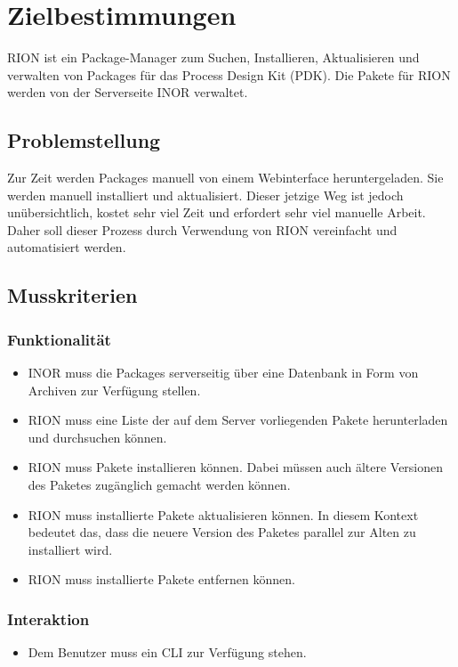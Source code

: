 \chapter{Zielbestimmungen}

RION ist ein Package-Manager zum Suchen, Installieren, Aktualisieren und verwalten von Packages für das Process Design Kit (PDK). Die Pakete für RION werden von der Serverseite INOR verwaltet.

\section{Problemstellung}
Zur Zeit werden Packages manuell von einem Webinterface heruntergeladen. Sie werden manuell installiert und aktualisiert. Dieser jetzige Weg ist jedoch unübersichtlich, kostet sehr viel Zeit und erfordert sehr viel manuelle Arbeit. Daher soll dieser Prozess durch Verwendung von RION vereinfacht und automatisiert werden.

\section{Musskriterien}
\subsection{Funktionalität}
\begin{itemize}
		\item INOR muss die Packages serverseitig über eine Datenbank in Form von Archiven zur Verfügung stellen.
		\item RION muss eine Liste der auf dem Server vorliegenden Pakete herunterladen und durchsuchen können.
		\item RION muss Pakete installieren können. Dabei müssen auch ältere Versionen des Paketes zugänglich gemacht werden können.
		\item RION muss installierte Pakete aktualisieren können. In diesem Kontext bedeutet das, dass die neuere Version des Paketes parallel zur Alten zu installiert wird.
		\item RION muss installierte Pakete entfernen können.
\end{itemize}

\subsection{Interaktion}


\begin{itemize}
	\item Dem Benutzer muss ein CLI zur Verfügung stehen.
\end{itemize}

